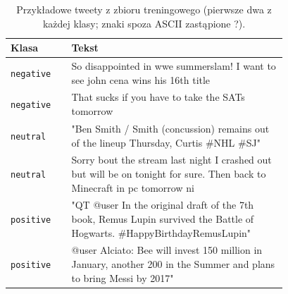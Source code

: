 \begin{table}[H]
\centering
\small
\caption{Przykładowe tweety z zbioru treningowego (pierwsze dwa z każdej klasy; znaki spoza ASCII zastąpione ?).}
\label{tab:cls-examples}
\begin{tabular}{@{}lp{0.78\linewidth}@{}}
\toprule
Klasa & Tekst \\
\midrule
\texttt{negative} & So disappointed in wwe summerslam! I want to see john cena wins his 16th title \\
\texttt{negative} & That sucks if you have to take the SATs tomorrow \\
\texttt{neutral} & "Ben Smith / Smith (concussion) remains out of the lineup Thursday, Curtis \#NHL \#SJ" \\
\texttt{neutral} & Sorry bout the stream last night I crashed out but will be on tonight for sure. Then back to Minecraft in pc tomorrow ni \\
\texttt{positive} & "QT @\allowbreak{}user In the original draft of the 7th book, Remus Lupin survived the Battle of Hogwarts. \#HappyBirthdayRemusLupin" \\
\texttt{positive} & @\allowbreak{}user Alciato: Bee will invest 150 million in January, another 200 in the Summer and plans to bring Messi by 2017" \\
\bottomrule
\end{tabular}
\end{table}
